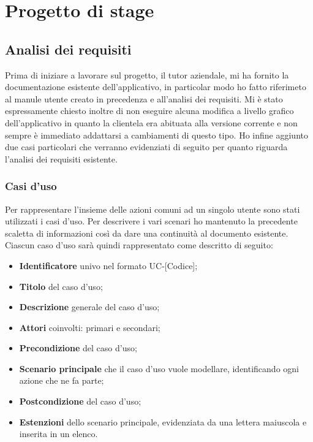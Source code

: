 
\chapter{Progetto di stage}
\label{cap:progetto-stage}

\section{Analisi dei requisiti}

Prima di iniziare a lavorare sul progetto, il tutor aziendale, mi ha fornito la documentazione esistente dell'applicativo, in particolar modo ho fatto riferimeto al manule
utente creato in precedenza e all'analisi dei requisiti. Mi è stato espressamente chiesto inoltre di non eseguire alcuna modifica a livello grafico dell'applicativo in quanto 
la clientela era abituata alla versione corrente e non sempre è immediato addattarsi a cambiamenti di questo tipo.
Ho infine aggiunto due casi particolari che verranno evidenziati di seguito per quanto riguarda l'analisi dei requisiti esistente.


\subsection{Casi d'uso}

Per rappresentare l'insieme delle azioni comuni ad un singolo utente sono stati utilizzati i casi d'uso.
Per descrivere i vari scenari ho mantenuto la precedente scaletta di informazioni così da dare una continuità al documento esistente. 
Ciascun caso d'uso sarà quindi rappresentato come descritto di seguito:
\begin{itemize}
    \item \textbf{Identificatore} univo nel formato UC-[Codice];
    \item \textbf{Titolo} del caso d'uso;
    \item \textbf{Descrizione} generale del caso d'uso;
    \item \textbf{Attori} coinvolti: primari e secondari;
    \item \textbf{Precondizione} del caso d'uso;
    \item \textbf{Scenario principale} che il caso d'uso vuole modellare, identificando ogni azione che ne fa parte;
    \item \textbf{Postcondizione} del caso d'uso;
    \item \textbf{Estenzioni} dello scenario principale, evidenziata da una lettera maiuscola e inserita in un elenco.
\end{itemize}


